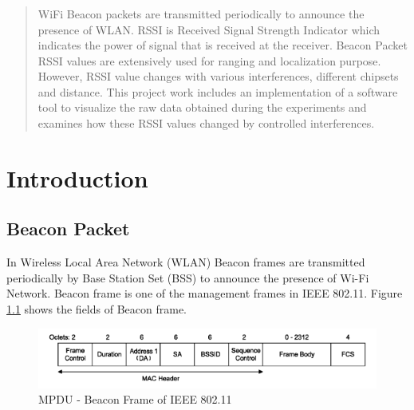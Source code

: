 \documentclass[11pt,a4paper,headinclude,footinclude,chapterprefix=on]{scrreprt}
\begin{document}
\begin{abstract}
	\subsection*{\abstractname} WiFi Beacon packets are transmitted periodically to announce the presence of WLAN. RSSI is Received Signal Strength Indicator which indicates the power of signal that is received at the receiver. Beacon Packet RSSI values are extensively used for ranging and localization purpose. However, RSSI value changes with various interferences, different chipsets and distance. This project work includes an implementation of a software tool to visualize the raw data obtained during the experiments and examines how these RSSI values changed by controlled interferences. 
\end{abstract}

\tableofcontents

\chapter{Introduction} 
\section{Beacon Packet} In Wireless Local Area Network (WLAN) Beacon frames are transmitted periodically by Base Station Set (BSS) to announce the presence of Wi-Fi Network. Beacon frame is one of the management frames in IEEE 802.11. Figure \ref{fig:beacon} shows the fields of Beacon frame.

\begin{figure}
	[!h] \centering 
	\includegraphics[width=15cm]{Images/beacon_frame.png} \caption{MPDU - Beacon Frame of IEEE 802.11} \label{fig:beacon} 
\end{figure}
\end{document}
